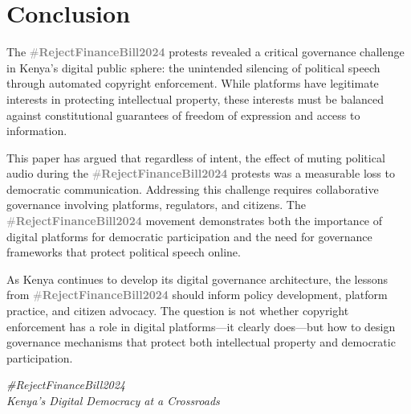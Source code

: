 \documentclass{article}
\newcommand{\rejectbill}{\textcolor{gray}{\#\textbf{RejectFinanceBill2024}}}
\begin{document}
\section{Conclusion}

The \rejectbill{} protests revealed a critical governance challenge in Kenya's digital public sphere: the unintended silencing of political speech through automated copyright enforcement. While platforms have legitimate interests in protecting intellectual property, these interests must be balanced against constitutional guarantees of freedom of expression and access to information.

This paper has argued that regardless of intent, the effect of muting political audio during the \rejectbill{} protests was a measurable loss to democratic communication. Addressing this challenge requires collaborative governance involving platforms, regulators, and citizens. The \rejectbill{} movement demonstrates both the importance of digital platforms for democratic participation and the need for governance frameworks that protect political speech online.

As Kenya continues to develop its digital governance architecture, the lessons from \rejectbill{} should inform policy development, platform practice, and citizen advocacy. The question is not whether copyright enforcement has a role in digital platforms—it clearly does—but how to design governance mechanisms that protect both intellectual property and democratic participation.

\vspace{1cm}
\begin{center}
\textit{\#RejectFinanceBill2024} \\
\textit{Kenya's Digital Democracy at a Crossroads}
\end{center}
\end{document}
